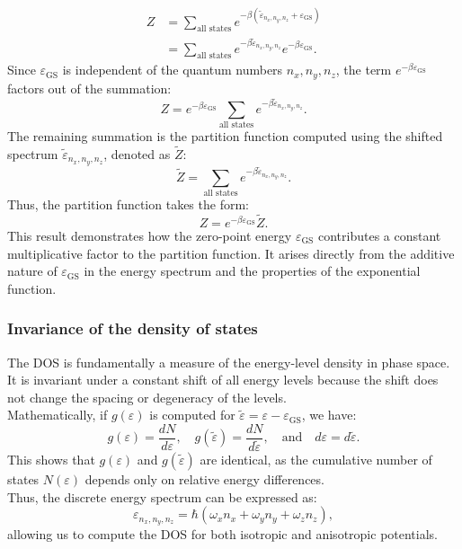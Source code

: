 \documentclass{article}
\numberwithin{equation}{section}
\numberwithin{equation}{subsection}
\begin{document}
\begin{align*}
Z &= \sum_{\text{all states}} e^{-\beta (\tilde{\varepsilon}_{\mathit{n}_{\mathit{x}},\mathit{n}_{\mathit{y}},\mathit{n}_{\mathit{z}}} + \varepsilon_{\text{GS}})} \\
  &= \sum_{\text{all states}} e^{-\beta \tilde{\varepsilon}_{\mathit{n}_{\mathit{x}},\mathit{n}_{\mathit{y}},\mathit{n}_{\mathit{z}}}} e^{-\beta \varepsilon_{\text{GS}}}.
\end{align*}
Since \( \varepsilon_{\text{GS}} \) is independent of the quantum numbers \( \mathit{n}_{\mathit{x}}, \mathit{n}_{\mathit{y}}, \mathit{n}_{\mathit{z}} \), the term \( e^{-\beta \varepsilon_{\text{GS}}} \) factors out of the summation:
\[
Z = e^{-\beta \varepsilon_{\text{GS}}} \sum_{\text{all states}} e^{-\beta \tilde{\varepsilon}_{\mathit{n}_{\mathit{x}},\mathit{n}_{\mathit{y}},\mathit{n}_{\mathit{z}}}}.
\]
The remaining summation is the partition function computed using the shifted spectrum \( \tilde{\varepsilon}_{\mathit{n}_{\mathit{x}},\mathit{n}_{\mathit{y}},\mathit{n}_{\mathit{z}}} \), denoted as \( \tilde{Z} \):
\[
\tilde{Z} = \sum_{\text{all states}} e^{-\beta \tilde{\varepsilon}_{\mathit{n}_{\mathit{x}},\mathit{n}_{\mathit{y}},\mathit{n}_{\mathit{z}}}}.
\]
Thus, the partition function takes the form:
\[
Z = e^{-\beta \varepsilon_{\text{GS}}} \tilde{Z}.
\]
This result demonstrates how the zero-point energy \( \varepsilon_{\text{GS}} \) contributes a constant multiplicative factor to the partition function. It arises directly from the additive nature of \( \varepsilon_{\text{GS}} \) in the energy spectrum and the properties of the exponential function.

\subsubsection{Invariance of the density of states}
The DOS is fundamentally a measure of the energy-level density in phase space. It is invariant under a constant shift of all energy levels because the shift does not change the spacing or degeneracy of the levels.\\
Mathematically, if \( g(\varepsilon) \) is computed for \( \tilde{\varepsilon} = \varepsilon - \varepsilon_{\text{GS}} \), we have:
\[
g(\varepsilon) = \frac{dN}{d\varepsilon}, \quad g(\tilde{\varepsilon}) = \frac{dN}{d\tilde{\varepsilon}}, \quad \text{and} \quad d\varepsilon = d\tilde{\varepsilon}.
\]
This shows that \( g(\varepsilon) \) and \( g(\tilde{\varepsilon}) \) are identical, as the cumulative number of states \( N(\varepsilon) \) depends only on relative energy differences.\\
Thus, the discrete energy spectrum can be expressed as:
\begin{equation}
    \varepsilon_{\mathit{n}_{\mathit{x}},\mathit{n}_{\mathit{y}},\mathit{n}_{\mathit{z}}}  = \hbar(\omega_{\mathit{x}} \mathit{n}_{\mathit{x}} + \omega_{\mathit{y}} \mathit{n}_{\mathit{y}} + \omega_{\mathit{z}} \mathit{n}_{\mathit{z}}),
\end{equation}
allowing us to compute the DOS for both isotropic and anisotropic potentials.
\end{document}
